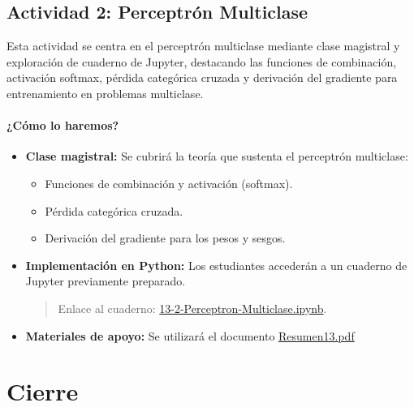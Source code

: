 \documentclass[a4,11pt]{aleph-notas}
\begin{document}
\subsection*{Actividad 2: Perceptrón Multiclase}

Esta actividad se centra en el perceptrón multiclase mediante clase magistral y exploración de cuaderno de Jupyter, destacando las funciones de combinación, activación softmax, pérdida categórica cruzada y derivación del gradiente para entrenamiento en problemas multiclase.

\paragraph{¿Cómo lo haremos?}  
\begin{itemize}[leftmargin=*]
    \item \textbf{Clase magistral:}
    Se cubrirá la teoría que sustenta el perceptrón multiclase:
    \begin{itemize}
        \item Funciones de combinación y activación (softmax).
        \item Pérdida categórica cruzada.
        \item Derivación del gradiente para los pesos y sesgos.
    \end{itemize}
    
    \item \textbf{Implementación en Python:} Los estudiantes accederán a un cuaderno de Jupyter previamente preparado.
    \begin{quote}
        Enlace al cuaderno: \href{https://github.com/andres-merino/AprendizajeAutomaticoInicial-05-N0105/blob/main/2-Notebooks/13-2-Perceptron-Multiclase.ipynb}{13-2-Perceptron-Multiclase.ipynb}.
    \end{quote}
    
    \item \textbf{Materiales de apoyo:} 
    Se utilizará el documento \href{https://andres-merino.github.io/AprendizajeAutomaticoInicial-05-N0105/2-Resumenes/Resumen13.pdf}{Resumen13.pdf}
    
\end{itemize}

\section*{Cierre}
\end{document}

